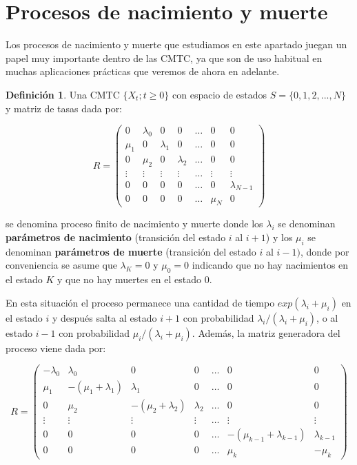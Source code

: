 \documentclass[
]{book}
\newenvironment{yellowbox}{
  \definecolor{shadecolor}{rgb}{210, 180, 140}  
  \color{black}
  \begin{shaded}}
 {\end{shaded}}
\theoremstyle{definition}
\newtheorem{definition}{Definición}[chapter]
\theoremstyle{definition}
\theoremstyle{definition}
\theoremstyle{definition}
\theoremstyle{remark}
\begin{document}
\hypertarget{CMTCD}{%
\section{Procesos de nacimiento y muerte}\label{CMTCD}}

Los procesos de nacimiento y muerte que estudiamos en este apartado juegan un papel muy importante dentro de las CMTC, ya que son de uso habitual en muchas aplicaciones prácticas que veremos de ahora en adelante.

\begin{yellowbox}

\begin{definition}
\protect\hypertarget{def:cmtc002}{}\label{def:cmtc002}Una CMTC \(\{X_t; t \geq 0\}\) con espacio de estados \(S = \{0, 1, 2,...,N\}\) y matriz de tasas dada por:

\[R = 
\begin{pmatrix}
0 & \lambda_0 & 0 & 0 & \ldots & 0 & 0 \\
\mu_1 & 0 & \lambda_1 & 0 & \ldots & 0 & 0 \\
0 & \mu_2 & 0 & \lambda_2 & \ldots & 0 & 0 \\
\vdots & \vdots & \vdots & \vdots & \ldots & \vdots & \vdots \\
0 & 0 & 0 & 0 & \ldots & 0 & \lambda_{N-1} \\
0 & 0 & 0 & 0 & \ldots &\mu_N & 0
\end{pmatrix} \]

se denomina proceso finito de nacimiento y muerte donde los \(\lambda_i\) se denominan \textbf{parámetros de nacimiento} (transición del estado \(i\) al \(i+1\)) y los \(\mu_i\) se denominan \textbf{parámetros de muerte} (transición del estado \(i\) al \(i-1)\), donde por conveniencia se asume que \(\lambda_K = 0\) y \(\mu_0 = 0\) indicando que no hay nacimientos en el estado \(K\) y que no hay muertes en el estado \(0\).
\end{definition}

\end{yellowbox}

En esta situación el proceso permanece una cantidad de tiempo \(exp(\lambda_i + \mu_i)\) en el estado \(i\) y después salta al estado \(i+1\) con probabilidad \(\lambda_i/(\lambda_i + \mu_i)\), o al estado \(i-1\) con probabilidad \(\mu_i/(\lambda_i + \mu_i)\). Además, la matriz generadora del proceso viene dada por:

\[R = 
\begin{pmatrix}
- \lambda_0& \lambda_0 & 0 & 0 & \ldots & 0 & 0 \\
\mu_1 & -(\mu_1 + \lambda_1) & \lambda_1 & 0 & \ldots & 0 & 0 \\
0 & \mu_2 & -(\mu_2 + \lambda_2) & \lambda_2 & \ldots & 0 & 0 \\
\vdots & \vdots & \vdots & \vdots & \ldots & \vdots & \vdots \\
0 & 0 & 0 & 0 & \ldots & -(\mu_{k-1} + \lambda_{k-1}) & \lambda_{k-1} \\
0 & 0 & 0 & 0 & \ldots & \mu_k & -\mu_k
\end{pmatrix} \]
\end{document}
